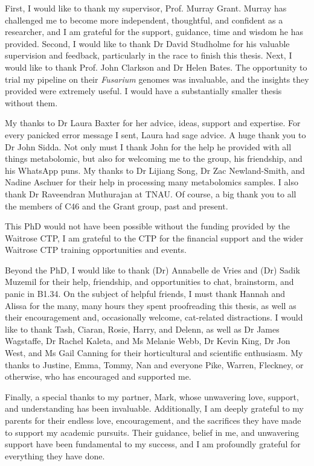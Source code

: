 
First, I would like to thank my supervisor, Prof. Murray Grant. Murray has challenged me to become more independent, thoughtful, and confident as a researcher, and I am grateful for the support, guidance, time and wisdom he has provided. Second, I would like to thank Dr David Studholme for his valuable supervision and feedback, particularly in the race to finish this thesis. Next, I would like to thank Prof. John Clarkson and Dr Helen Bates. The opportunity to trial my pipeline on their \textit{Fusarium} genomes was invaluable, and the insights they provided were extremely useful. I would have a substantially smaller thesis without them. 

My thanks to Dr Laura Baxter for her advice, ideas, support and expertise. For every panicked error message I sent, Laura had sage advice. A huge thank you to Dr John Sidda. Not only must I thank John for the help he provided with all things metabolomic, but also for welcoming me to the group, his friendship, and his WhatsApp puns. My thanks to Dr Lijiang Song, Dr Zac Newland-Smith, and Nadine Aschuer for their help in processing many metabolomics samples. I also thank Dr Raveendran Muthurajan at TNAU. Of course, a big thank you to all the members of C46 and the Grant group, past and present. 

This PhD would not have been possible without the funding provided by the Waitrose CTP, I am grateful to the CTP for the financial support and the wider Waitrose CTP training opportunities and events. 

Beyond the PhD, I would like to thank (Dr) Annabelle de Vries and (Dr) Sadik Muzemil for their help, friendship, and opportunities to chat, brainstorm, and panic in B1.34. On the subject of helpful friends, I must thank Hannah and Alissa for the many, many hours they spent proofreading this thesis, as well as their encouragement and, occasionally welcome, cat-related distractions. I would like to thank Tash, Ciaran, Rosie, Harry, and Delenn, as well as Dr James Wagstaffe, Dr Rachel Kaleta, and Ms Melanie Webb, Dr Kevin King, Dr Jon West, and Ms Gail Canning for their horticultural and scientific enthusiasm. My thanks to Justine, Emma, Tommy, Nan and everyone Pike, Warren,  Fleckney, or otherwise, who has encouraged and supported me.  

Finally, a special thanks to my partner, Mark, whose unwavering love, support, and understanding has been invaluable. Additionally, I am deeply grateful to my parents for their endless love, encouragement, and the sacrifices they have made to support my academic pursuits. Their guidance, belief in me, and unwavering support have been fundamental to my success, and I am profoundly grateful for everything they have done. 




